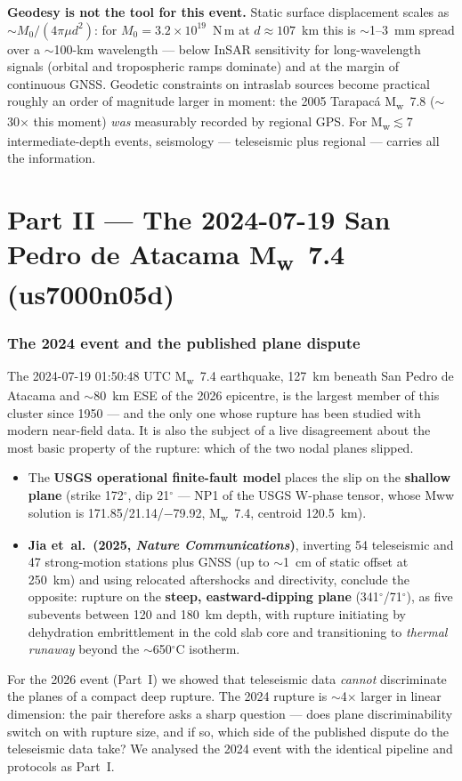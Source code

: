 \documentclass[11pt]{article}
\newcommand{\Mw}{M\textsubscript{w}}
\begin{document}
\textbf{Geodesy is not the tool for this event.} Static surface displacement scales as
$\sim M_0/(4\pi\mu d^2)$: for $M_0=3.2\times10^{19}$~N\,m at $d\approx107$~km this is
$\sim$1--3~mm spread over a $\sim$100-km wavelength --- below InSAR sensitivity for
long-wavelength signals (orbital and tropospheric ramps dominate) and at the margin of
continuous GNSS. Geodetic constraints on intraslab sources become practical roughly an order
of magnitude larger in moment: the 2005 Tarapac\'a \Mw~7.8 ($\sim$30$\times$ this moment)
\emph{was} measurably recorded by regional GPS. For \Mw$\lesssim$7 intermediate-depth
events, seismology --- teleseismic plus regional --- carries all the information.


\part*{Part II --- The 2024-07-19 San Pedro de Atacama \Mw~7.4 (us7000n05d)}

\section{The 2024 event and the published plane dispute}
The 2024-07-19 01:50:48 UTC \Mw~7.4 earthquake, 127~km beneath San Pedro de Atacama and
$\sim$80~km ESE of the 2026 epicentre, is the largest member of this cluster since 1950 ---
and the only one whose rupture has been studied with modern near-field data. It is also the
subject of a live disagreement about the most basic property of the rupture: which of the two
nodal planes slipped.
\begin{itemize}
\item The \textbf{USGS operational finite-fault model} places the slip on the
  \textbf{shallow plane} (strike 172$^\circ$, dip 21$^\circ$ --- NP1 of the USGS W-phase
  tensor, whose Mww solution is 171.85/21.14/$-$79.92, \Mw~7.4, centroid 120.5~km).
\item \textbf{Jia et~al.\ (2025, \emph{Nature Communications})}, inverting 54 teleseismic and
  47 strong-motion stations plus GNSS (up to $\sim$1~cm of static offset at 250~km) and using
  relocated aftershocks and directivity, conclude the opposite: rupture on the
  \textbf{steep, eastward-dipping plane} (341$^\circ$/71$^\circ$), as five subevents between
  120 and 180~km depth, with rupture initiating by dehydration embrittlement in the cold slab
  core and transitioning to \emph{thermal runaway} beyond the $\sim$650$^\circ$C isotherm.
\end{itemize}
For the 2026 event (Part~I) we showed that teleseismic data \emph{cannot} discriminate the
planes of a compact deep rupture. The 2024 rupture is $\sim$4$\times$ larger in linear
dimension: the pair therefore asks a sharp question --- does plane discriminability switch on
with rupture size, and if so, which side of the published dispute do the teleseismic data
take? We analysed the 2024 event with the identical pipeline and protocols as Part~I.
\end{document}
